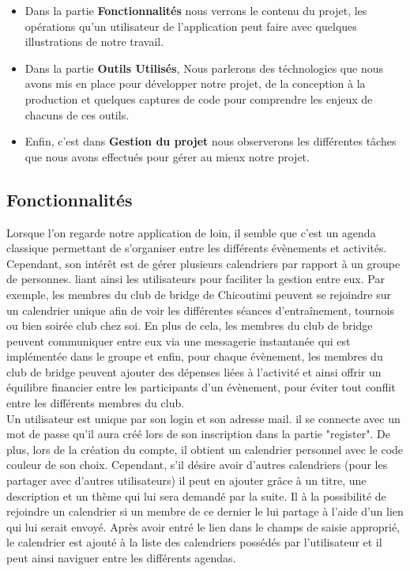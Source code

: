 \begin{itemize}
    \item Dans la partie \textbf{Fonctionnalités} nous verrons le contenu du projet, les opérations qu'un utilisateur de l'application peut faire avec quelques illustrations de notre travail.
    \item Dans la partie \textbf{Outils Utilisés}, Nous parlerons des téchnologies que nous avons mis en place pour développer notre projet, de la conception à la production et quelques captures de code pour comprendre les enjeux de chacuns de ces outils.
    \item Enfin, c'est dans \textbf{Gestion du projet} nous observerons les différentes tâches que nous avons effectués pour gérer au mieux notre projet.
\end{itemize}

\subsection{Fonctionnalités}

Lorsque l'on regarde notre application de loin, il semble que c'est un agenda classique permettant de s'organiser entre les différents évènements et activités. Cependant, son intérêt est de gérer plusieurs calendriers par rapport à un groupe de personnes. liant ainsi les utilisateurs pour faciliter la gestion entre eux. Par exemple, les membres du club de bridge de Chicoutimi peuvent se rejoindre sur un calendrier unique afin de voir les différentes séances d'entraînement, tournois ou bien soirée club chez soi. En plus de cela, les membres du club de bridge peuvent communiquer entre eux via une messagerie instantanée qui est implémentée dans le groupe et enfin, pour chaque évènement, les membres du club de bridge peuvent ajouter des dépenses liées à l'activité et ainsi offrir un équilibre financier entre les participants d'un évènement, pour éviter tout conflit entre les différents membres du club.
\\

Un utilisateur est unique par son login et son adresse mail. il se connecte avec un mot de passe qu'il aura créé lors de son inscription dans la partie "register". De plus, lors de la création du compte, il obtient un calendrier personnel avec le code couleur de son choix. Cependant, s'il désire avoir d'autres calendriers (pour les partager avec d'autres utilisateurs) il peut en ajouter grâce à un titre, une description et un thème qui lui sera demandé par la suite.
Il à la possibilité de rejoindre un calendrier si un membre de ce dernier le lui partage à l'aide d'un lien qui lui serait envoyé. Après avoir entré le lien dans le champs de saisie approprié, le calendrier est ajouté à la liste des calendriers possédés par l'utilisateur et il peut ainsi naviguer entre les différents agendas. 
\\

